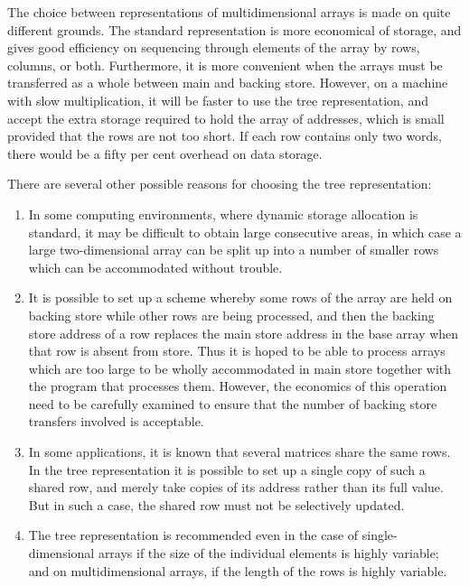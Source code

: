 The choice between representations of multidimensional arrays is made on quite different grounds. The standard representation is more economical of storage, and gives good efficiency on sequencing through elements of the array by rows, columns, or both. Furthermore, it is more convenient when the arrays must be transferred as a whole between main and backing store. However, on a machine with slow multiplication, it will be faster to use the tree representation, and accept the extra storage required to hold the array of addresses, which is small provided that the rows are not too short. If each row contains only two words, there would be a fifty per cent overhead on data storage.

There are several other possible reasons for choosing the tree representation:

\begin{enumerate}[leftmargin=2\parindent, label=(\arabic*)]
	\item In some computing environments, where dynamic storage allocation is standard, it may be difficult to obtain large consecutive areas, in which case a large two-dimensional array can be split up into a number of smaller rows which can be accommodated without trouble.

	\item It is possible to set up a scheme whereby some rows of the array are held on backing store while other rows are being processed, and then the backing store address of a row replaces the main store address in the base array when that row is absent from store. Thus it is hoped to be able to process arrays which are too large to be wholly accommodated in main store together with the program that processes them. However, the economics of this operation need to be carefully examined to ensure that the number of backing store transfers involved is acceptable.

	\item In some applications, it is known that several matrices share the same rows. In the tree representation it is possible to set up a single copy of such a shared row, and merely take copies of its address rather than its full value. But in such a case, the shared row must not be selectively updated.

	\item The tree representation is recommended even in the case of single-dimensional arrays if the size of the individual elements is highly variable; and on multidimensional arrays, if the length of the rows is highly variable.
\end{enumerate}

